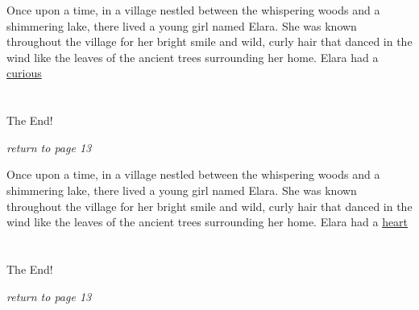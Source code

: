 \documentclass{memoir}
\begin{document}
        


        \hspace{1cm}\vfill
        \begin{minipage}{3in}
        \LARGE
        Once upon a time, in a village nestled between the whispering woods and a shimmering lake, there lived a young girl named Elara. She was known throughout the village for her bright smile and wild, curly hair that danced in the wind like the leaves of the ancient trees surrounding her home. Elara had a \ul{curious}\\ \vspace{5mm} \\
 \\\vspace{1cm} The End! \\ 

        \hspace{1cm}\begin{minipage}{6cm}
        \normalsize
            \hfill \textit{return to page 13}
        \end{minipage} 
        \end{minipage}
        \hspace{1cm}\vfill
        \cleardoublepage

        


        \hspace{1cm}\vfill
        \begin{minipage}{3in}
        \LARGE
        Once upon a time, in a village nestled between the whispering woods and a shimmering lake, there lived a young girl named Elara. She was known throughout the village for her bright smile and wild, curly hair that danced in the wind like the leaves of the ancient trees surrounding her home. Elara had a \ul{heart}\\ \vspace{5mm} \\
 \\\vspace{1cm} The End! \\ 

        \hspace{1cm}\begin{minipage}{6cm}
        \normalsize
            \hfill \textit{return to page 13}
        \end{minipage} 
        \end{minipage}
        \hspace{1cm}\vfill
        \cleardoublepage
\end{document}

